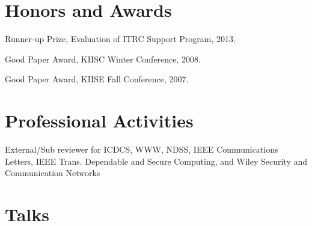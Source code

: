 \documentclass[letterpaper]{article}
\renewenvironment{itemize}{
  \begin{list}{}{
    \setlength{\leftmargin}{1.5em}
  }
}{
  \end{list}
}
\begin{document}
\section*{Honors and Awards}

\begin{itemize}
 \item Runner-up Prize, Evaluation of ITRC Support Program, 2013.
 \item Good Paper Award, KIISC Winter Conference, 2008.
 \item Good Paper Award, KIISE Fall Conference, 2007.
\end{itemize}

\section*{Professional Activities}

\begin{itemize}
\item External/Sub reviewer for ICDCS, WWW, NDSS, IEEE Communications Letters, IEEE Trans. Dependable and Secure Computing, and Wiley Security and Communication Networks
\end{itemize}

\section*{Talks}
\end{document}
